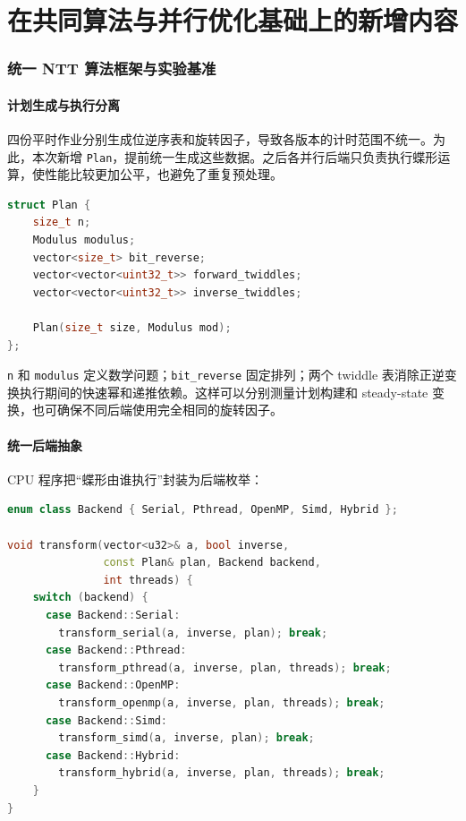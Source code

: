 \part{在共同算法与并行优化基础上的新增内容}

\section{统一 NTT 算法框架与实验基准}\newwork

\subsection{计划生成与执行分离}

四份平时作业分别生成位逆序表和旋转因子，导致各版本的计时范围不统一。为此，本次新增 \texttt{Plan}，提前统一生成这些数据。之后各并行后端只负责执行蝶形运算，使性能比较更加公平，也避免了重复预处理。

\begin{lstlisting}[title=统一NTT计划结构,label={lst:plan},language={C++}]
struct Plan {
    size_t n;
    Modulus modulus;
    vector<size_t> bit_reverse;
    vector<vector<uint32_t>> forward_twiddles;
    vector<vector<uint32_t>> inverse_twiddles;

    Plan(size_t size, Modulus mod);
};
\end{lstlisting}

\texttt{n} 和 \texttt{modulus} 定义数学问题；\texttt{bit\_reverse} 固定排列；两个 twiddle 表消除正逆变换执行期间的快速幂和递推依赖。这样可以分别测量计划构建和 steady-state 变换，也可确保不同后端使用完全相同的旋转因子。

\subsection{统一后端抽象}

CPU 程序把“蝶形由谁执行”封装为后端枚举：

\begin{lstlisting}[title=统一CPU后端分派,label={lst:backend-dispatch},language={C++}]
enum class Backend { Serial, Pthread, OpenMP, Simd, Hybrid };

void transform(vector<u32>& a, bool inverse,
               const Plan& plan, Backend backend,
               int threads) {
    switch (backend) {
      case Backend::Serial:
        transform_serial(a, inverse, plan); break;
      case Backend::Pthread:
        transform_pthread(a, inverse, plan, threads); break;
      case Backend::OpenMP:
        transform_openmp(a, inverse, plan, threads); break;
      case Backend::Simd:
        transform_simd(a, inverse, plan); break;
      case Backend::Hybrid:
        transform_hybrid(a, inverse, plan, threads); break;
    }
}
\end{lstlisting}

